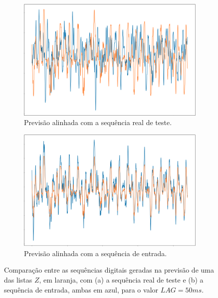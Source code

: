 \begin{figure}
     \centering
     \begin{subfigure}[b]{0.49\textwidth}
         \centering
         \includegraphics[width=\textwidth]{images/lstm-after.png}
         \caption{Previsão alinhada com a sequência real de teste.}
         \label{fig:y equals x}
     \end{subfigure}
     \hfill
     \begin{subfigure}[b]{0.49\textwidth}
         \centering
         \includegraphics[width=\textwidth]{images/lstm-before.png}
         \caption{Previsão alinhada com a sequência de entrada.}
         \label{fig:three sin x}
     \end{subfigure}
        \caption{Comparação entre as sequências digitais geradas na previsão de uma das listas $Z$, em laranja, com (a) a sequência real de teste e (b) a sequência de entrada, ambas em azul, para o valor $LAG = 50  ms$.}
        \label{fig:lstm-repetition-results}
\end{figure}

